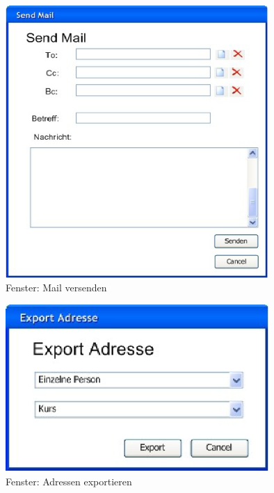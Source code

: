 %
\begin{figure}[ht]
\includegraphics[width=10cm]{images/sendMail.png}
\caption{Fenster: Mail versenden}
\end{figure}
\clearpage

\begin{figure}[ht]
\includegraphics[width=10cm]{images/exportAddress.png}
\caption{Fenster: Adressen exportieren}
\end{figure}
\clearpage

